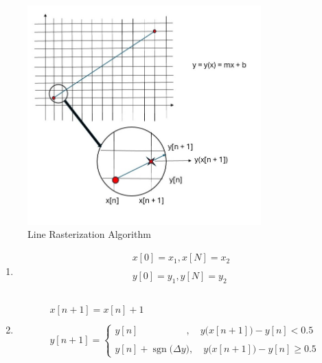 \documentclass{article}
\DeclareMathOperator{\sgn}{sgn}
\begin{document}
\begin{figure}[ht!]
\centering
\includegraphics[width=90mm]{Line Rasterization.jpg}
\caption{Line Rasterization Algorithm \label{overflow}}
\end{figure}

\begin{enumerate}
    \item {}
           \begin{align*}
                x[0] = x_{1}, x[N] = x_{2} \\ \\
                y[0] = y_{1}, y[N] = y_{2} \\ \\ 
             \end{align*}
    \item {} 
           \begin{align*}
                &x[n + 1] = x[n] + 1 \\ \\ 
                &y[n + 1] = \begin{cases}
                                y[n] \quad \quad \quad \quad \quad, \quad y\big(x[n + 1]\big) - y[n] < 0.5 \\ \\
                                y[n] + \sgn\big(\Delta y\big), \quad y\big(x[n + 1]\big) - y[n] \geq 0.5 
                              \end{cases} 
            \end{align*}
\end{enumerate}
\end{document}
